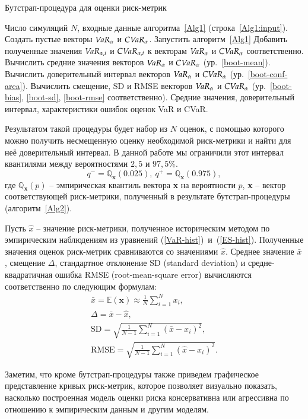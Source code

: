 \begin{algorithm}[t]
\caption{Бутстрап-процедура для оценки риск-метрик}
\label{Alg2}
\begin{algorithmic}[1]
	\Require Число симуляций $N$, входные данные алгоритма~\ref{Alg1} (строка~\ref{Alg1:input}).
	\State Создать пустые векторы $\emph{VaR}_\alpha$ и $\emph{CVaR}_\alpha$.
	    \State Запустить алгоритм~\ref{Alg1}
	    \State Добавить полученные значения $\emph{VaR}_{\alpha, i}$ и $\emph{CVaR}_{\alpha, i}$ к векторам $\emph{VaR}_\alpha$ и $\emph{CVaR}_\alpha$ соответственно.
	\EndFor
	\State Вычислить средние значения векторов $\emph{VaR}_\alpha$ и $\emph{CVaR}_\alpha$ (ур.~\ref{boot-mean}).
	\State Вычислить доверительный интервал векторов $\emph{VaR}_\alpha$ и $\emph{CVaR}_\alpha$ (ур.~\ref{boot-conf-area}).
	\State Вычислить смещение, SD и RMSE векторов $\emph{VaR}_\alpha$ и $\emph{CVaR}_\alpha$ (ур.~\ref{boot-bias}, \ref{boot-sd}, \ref{boot-rmse} соответственно).
	\Ensure Средние значения, доверительный интервал, характеристики ошибок оценок VaR и CVaR.
\end{algorithmic}
\end{algorithm}

Результатом такой процедуры будет набор из $N$ оценок, с помощью которого можно получить %
несмещенную оценку необходимой риск-метрики и найти для неё доверительный интервал. В данной работе мы ограничили этот интервал квантилями между вероятностями $2,5$ и $97,5\%$.
\begin{equation} \label{boot-conf-area}
    q^- = \mathbb{Q}_{\textbf{x}} (0.025), \ q^+ = \mathbb{Q}_{\textbf{x}} (0.975),
\end{equation}
где $\mathbb{Q}_{\textbf{x}} (p)$ -- эмпирическая квантиль вектора \textbf{x} на вероятности $p$, \textbf{x} -- вектор соответствующей риск-метрики, полученный в результате бутстрап-процедуры (алгоритм~\ref{Alg2}).

Пусть $\hat{x}$ -- значение риск-метрики, полученное историческим методом по эмпирическим наблюдениям из уравнений (\ref{VaR-hist})~и~(\ref{ES-hist}).
Полученные значения оценок риск-метрик сравниваются со значениями $\hat{x}$.
Среднее значение $\bar{x}$, смещение $\Delta$, стандартное отклонение SD (standard deviation) и средне-квадратичная ошибка RMSE (root-mean-square error) вычисляются соответственно по следующим формулам:
\begin{gather}
\bar{x} = \mathbb{E} (\textbf{x}) \approx \frac{1}{N} \sum_{i=1}^N x_i, \label{boot-mean} \\
\Delta = \bar{x} - \hat{x}, \label{boot-bias} \\
\text{SD} = \sqrt{\frac{1}{N-1} \sum_{i=1}^N (\bar{x} - x_i)^2}, \label{boot-sd} \\
\text{RMSE} = \sqrt{\frac{1}{N-1} \sum_{i=1}^N (\hat{x} - x_i)^2}. \label{boot-rmse}
\end{gather}

Заметим, что кроме бутстрап-процедуры также приведем  графическое представление кривых риск-метрик, которое позволяет визуально показать, насколько построенная модель оценки риска консервативна или агрессивна по отношению к эмпирическим данным и другим моделям. %